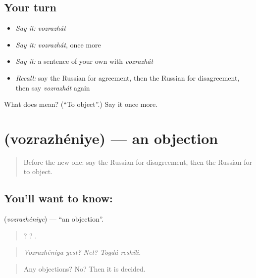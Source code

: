 \subsection*{Your turn}
\begin{itemize}
\raggedright
  \item \emph{Say it:} \emph{vozrazhát}
  \item \emph{Say it:} \emph{vozrazhát}, once more
  \item \emph{Say it:} a sentence of your own with \emph{vozrazhát}
  \item \emph{Recall:} say the Russian for agreement, then the Russian for disagreement, then say \emph{vozrazhát} again
\end{itemize}

\begin{tcolorbox}[breakable,colback=teal!4,colframe=teal!35!black,title={Before you move on}]
What does  mean? (\textquotedblleft{}To object\textquotedblright{}.) Say it once more.
\end{tcolorbox}
\section[\texorpdfstring{\ru{возражение} (vozrazhéniye)}{возражение (vozrazhéniye)}]{ (vozrazhéniye) — an objection}

\label{lesson:RU-C340-vozrazhenie}



\begin{quote}
Before the new one: say the Russian for disagreement, then the Russian for to object.
\end{quote}

\subsection*{You'll want to know: }
\textbf{} (\emph{vozrazhéniye}) — \textquotedblleft{}an objection\textquotedblright{}.

\begin{quote}
 ? ?  .
\end{quote}

\begin{quote}
\emph{Vozrazhéniya yest? Net? Togdá reshíli.}
\end{quote}

\begin{quote}
Any objections? No? Then it is decided.
\end{quote}

